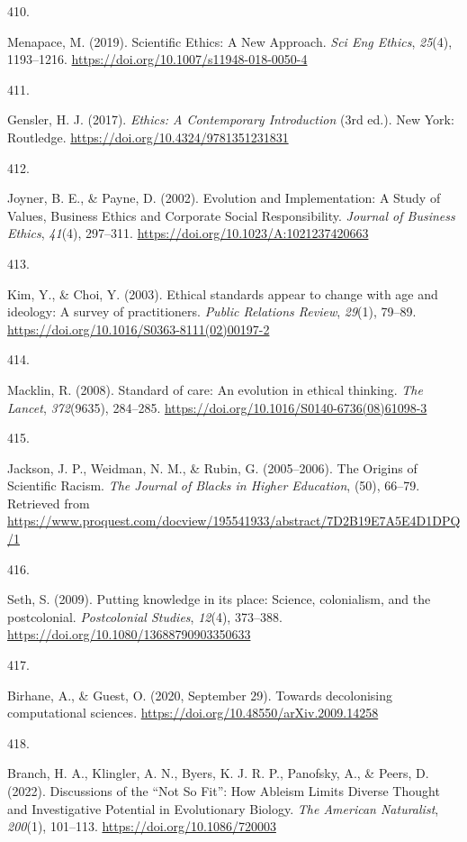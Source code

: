 \documentclass[
  11pt,
  letterpaper,
]{scrreprt}
\newlength{\cslhangindent}
\newlength{\csllabelwidth}
\newenvironment{CSLReferences}[2] %
 {\begin{list}{}{%
  \setlength{\itemindent}{0pt}
  \setlength{\leftmargin}{0pt}
  \setlength{\parsep}{0pt}
  \ifodd #1
   \setlength{\leftmargin}{\cslhangindent}
   \setlength{\itemindent}{-1\cslhangindent}
  \fi
  \setlength{\itemsep}{#2\baselineskip}}}
 {\end{list}}
\newcommand{\CSLLeftMargin}[1]{\parbox[t]{\csllabelwidth}{\strut#1\strut}}
\newcommand{\CSLRightInline}[1]{\parbox[t]{\linewidth - \csllabelwidth}{\strut#1\strut}}
\begin{document}
\begin{CSLReferences}{0}{0}
\CSLLeftMargin{410. }%
\CSLRightInline{Menapace, M. (2019). Scientific {Ethics}: {A New
Approach}. \emph{Sci Eng Ethics}, \emph{25}(4), 1193--1216.
\url{https://doi.org/10.1007/s11948-018-0050-4}}

\CSLLeftMargin{411. }%
\CSLRightInline{Gensler, H. J. (2017). \emph{Ethics: {A Contemporary
Introduction}} (3rd ed.). New York: Routledge.
\url{https://doi.org/10.4324/9781351231831}}

\CSLLeftMargin{412. }%
\CSLRightInline{Joyner, B. E., \& Payne, D. (2002). Evolution and
{Implementation}: {A Study} of {Values}, {Business Ethics} and
{Corporate Social Responsibility}. \emph{Journal of Business Ethics},
\emph{41}(4), 297--311. \url{https://doi.org/10.1023/A:1021237420663}}

\CSLLeftMargin{413. }%
\CSLRightInline{Kim, Y., \& Choi, Y. (2003). Ethical standards appear to
change with age and ideology: A survey of practitioners. \emph{Public
Relations Review}, \emph{29}(1), 79--89.
\url{https://doi.org/10.1016/S0363-8111(02)00197-2}}

\CSLLeftMargin{414. }%
\CSLRightInline{Macklin, R. (2008). Standard of care: An evolution in
ethical thinking. \emph{The Lancet}, \emph{372}(9635), 284--285.
\url{https://doi.org/10.1016/S0140-6736(08)61098-3}}

\CSLLeftMargin{415. }%
\CSLRightInline{Jackson, J. P., Weidman, N. M., \& Rubin, G.
(2005--2006). The {Origins} of {Scientific Racism}. \emph{The Journal of
Blacks in Higher Education}, (50), 66--79. Retrieved from
\url{https://www.proquest.com/docview/195541933/abstract/7D2B19E7A5E4D1DPQ/1}}

\CSLLeftMargin{416. }%
\CSLRightInline{Seth, S. (2009). Putting knowledge in its place:
Science, colonialism, and the postcolonial. \emph{Postcolonial Studies},
\emph{12}(4), 373--388. \url{https://doi.org/10.1080/13688790903350633}}

\CSLLeftMargin{417. }%
\CSLRightInline{Birhane, A., \& Guest, O. (2020, September 29). Towards
decolonising computational sciences.
\url{https://doi.org/10.48550/arXiv.2009.14258}}

\CSLLeftMargin{418. }%
\CSLRightInline{Branch, H. A., Klingler, A. N., Byers, K. J. R. P.,
Panofsky, A., \& Peers, D. (2022). Discussions of the {``{Not So
Fit}''}: {How Ableism Limits Diverse Thought} and {Investigative
Potential} in {Evolutionary Biology}. \emph{The American Naturalist},
\emph{200}(1), 101--113. \url{https://doi.org/10.1086/720003}}


\end{CSLReferences}
\end{document}
